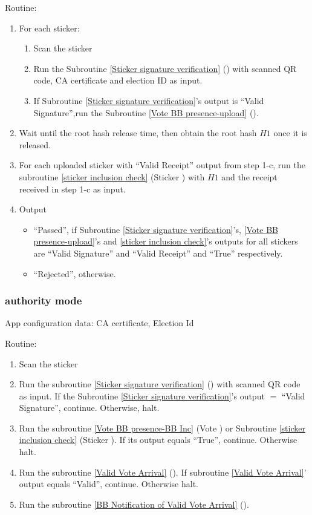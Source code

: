 \documentclass{article}
\begin{document}
Routine:
\begin{enumerate}
    \item For each sticker:
    \begin{enumerate}
        \item Scan the sticker
        \item Run the Subroutine \ref{Sticker signature verification} (\StickersignatureVerification{}) with scanned QR code, CA certificate and election ID as input. 
        \item If Subroutine \ref{Sticker signature verification}'s output is ``Valid Signature'',run the Subroutine \ref{Vote BB presence-upload} (\StickerBBUpload{}).
    \end{enumerate}
    \item Wait until the root hash release time, then obtain the root hash $H1$ once it is released.
    \item For each uploaded sticker with ``Valid Receipt'' output from step 1-c, run the subroutine \ref{sticker inclusion check} (Sticker \BBInclusionCheck{}) with  $H1$ and the receipt received in step 1-c as input. 
    \item Output
    \begin{itemize}
        \item ``Passed'',  if Subroutine \ref{Sticker signature verification}'s, \ref{Vote BB presence-upload}'s and \ref{sticker inclusion check}'s outputs for all stickers are ``Valid Signature'' and ``Valid Receipt'' and ``True'' respectively.
        \item ``Rejected'', otherwise.
    \end{itemize}
\end{enumerate}




\subsubsection{\localVotingCenter{} authority mode}
App configuration data: CA certificate, Election Id

Routine:
\begin{enumerate}
    \item Scan the sticker
    \item Run the subroutine \ref{Sticker signature verification} (\StickersignatureVerification{}) with scanned QR code as input. If the Subroutine \ref{Sticker signature verification}'s output $=$ ``Valid Signature'', continue. Otherwise, halt.
    \item Run the subroutine \ref{Vote BB presence-BB Inc} (Vote \BBInclusionCheck{}) or Subroutine \ref{sticker inclusion check} (Sticker \BBInclusionCheck{}). If its output equals ``True'', continue. Otherwise halt.
    \item Run the subroutine \ref{Valid Vote Arrival} (\ValidVoteArrival{}). If subroutine \ref{Valid Vote Arrival}' output equals ``Valid'', continue. Otherwise halt.
    \item Run the subroutine \ref{BB Notification of Valid Vote Arrival} (\ArrivalBBNotification{}).
\end{enumerate}
\end{document}
